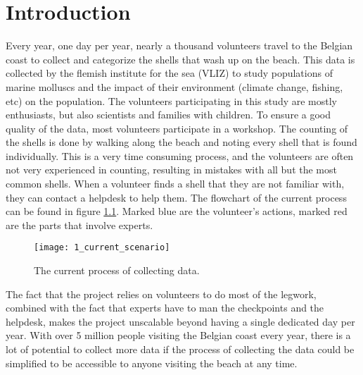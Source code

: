 
\chapter{Introduction}

Every year, one day per year, nearly a thousand volunteers travel to the Belgian coast to collect and categorize the shells that wash up on the beach. This data is collected by the flemish institute for the sea (VLIZ) to study populations of marine molluscs and the impact of their environment (climate change, fishing, etc) on the population. The volunteers participating in this study are mostly enthusiasts, but also scientists and families with children. To ensure a good quality of the data, most volunteers participate in a workshop. The counting of the shells is done by walking along the beach and noting every shell that is found individually. This is a very time consuming process, and the volunteers are often not very experienced in counting, resulting in mistakes with all but the most common shells. When a volunteer finds a shell that they are not familiar with, they can contact a helpdesk to help them. The flowchart of the current process can be found in figure \ref{fig:1_current_scenario}. Marked blue are the volunteer's actions, marked red are the parts that involve experts.

\begin{figure}[h]
	\centering
	\texttt{[image: 1\_current\_scenario]}
	\caption{\label{fig:1_current_scenario} The current process of collecting data.}

\end{figure}

The fact that the project relies on volunteers to do most of the legwork, combined with the fact that experts have to man the checkpoints and the helpdesk, makes the project unscalable beyond having a single dedicated day per year. With over 5 million people
visiting the Belgian coast every year, there is a lot of potential to collect more data if the process of collecting the data could be simplified to be accessible to anyone visiting the beach at any time.

